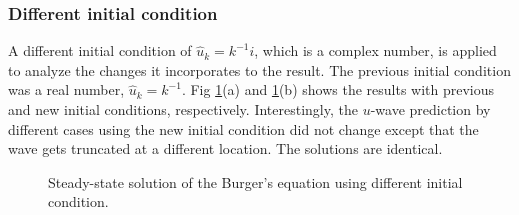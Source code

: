 \documentclass[a4paper]{article}
\begin{document}
\subsubsection{Different initial condition}
A different initial condition of $ \hat{u}_k=k^{-1}i $, which is a complex number, is applied to analyze the changes it incorporates to the result. The previous initial condition was a real number, $ \hat{u}_k=k^{-1} $. Fig \ref{fig:Diff_IC}(a) and \ref{fig:Diff_IC}(b) shows the results with previous and new initial conditions, respectively. Interestingly, the $ u $-wave prediction by different cases using the new initial condition did not change except that the wave gets truncated at a different location. The solutions are identical.

\begin{figure}[H]
	\centering
	\begin{minipage}[b]{0.52\textwidth}
	\end{minipage}%
	\begin{minipage}[b]{0.52\textwidth}
	\end{minipage}
	\caption{Steady-state solution of the Burger's equation using different initial condition.}
	\label{fig:Diff_IC}
\end{figure}

%	
\end{document}
